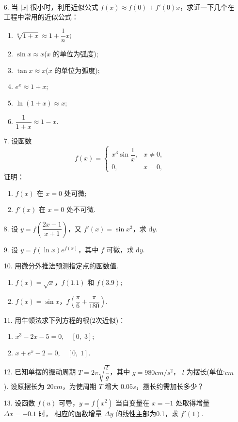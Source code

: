 \begin{enumerate}
    \item[6.] 当 $|x|$ 很小时，利用近似公式 $f(x)\approx f(0)+f'(0)x$，求证一下几个在工程中常用的近似公式：
    \begin{enumerate}[(1)]\setlength{\itemsep}{5pt}\setlength{\topsep}{15pt}
        \item $\sqrt[n]{1+x}\approx 1+\dfrac{1}{n}x$;
        \item $\sin x\approx x$($x$ 的单位为弧度);
        \item $\tan x\approx x$($x$ 的单位为弧度);
        \item $e^{x} \approx 1+x$;
        \item $\ln(1+x)\approx x$;
        \item $\dfrac{1}{1+x}\approx 1-x$.
    \end{enumerate}

    \item[7.] 设函数
    \[
        f(x)=\begin{cases}
            x^3\sin\dfrac{1}{x},&x\not=0,\\
            0,&x=0,
        \end{cases}
    \]  
    证明：
    \begin{enumerate}[(1)]\setlength{\itemsep}{5pt}\setlength{\topsep}{15pt}
        \item $f(x)$ 在 $x=0$ 处可微;
        \item $f'(x)$ 在 $x=0$ 处不可微.
    \end{enumerate}

    \item[8.] 设 $y=f\left(\dfrac{2x-1}{x+1}\right)$，又 $f'(x)=\sin x^2$，求 $\text{d}y$.
    
    \item[9.] 设 $y=f(\ln x)e^{f(x)}$，其中 $f$ 可微，求 $\text{d}y$.
    
    \item[10.] 用微分外推法预测指定点的函数值.
    \begin{enumerate}[(1)]\setlength{\itemsep}{5pt}\setlength{\topsep}{15pt}
        \item $f(x)=\sqrt{x}$，$f(1.1)$ 和 $f(3.9)$;
        \item $f(x)=\sin x$，$f\left(\dfrac{\pi}{6}+\dfrac{\pi}{180}\right)$.
    \end{enumerate}

    \item[11.] 用牛顿法求下列方程的根(2次近似)：
    \begin{enumerate}[(1)]\setlength{\itemsep}{5pt}\setlength{\topsep}{15pt}
        \item $x^3-2x-5=0,\quad[0,\;3]$;
        \item $x+e^x-2=0,\quad[0,\;1]$.
    \end{enumerate}

    \item[12.] 已知单摆的振动周期 $T=2\pi\sqrt{\dfrac{l}{g}}$，其中 $g=980cm/s^2$，
    $l$ 为摆长(单位:$cm$). 设原摆长为 $20cm$，为使周期 $T$ 增大 $0.05s$，摆长约需加长多少？

    \item[13.] 设函数 $f(u)$ 可导，$y=f(x^2)$ 当自变量在 $x=-1$ 处取得增量 $\Delta x=-0.1$ 时，
    相应的函数增量 $\Delta y$ 的线性主部为0.1，求 $f'(1)$.

\end{enumerate}